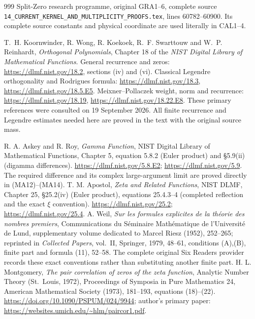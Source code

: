 \documentclass[11pt,a4paper]{article}
\begin{document}
\begin{thebibliography}{999}
Split-Zero research programme, original GRA1--6, complete source
\texttt{14\_CURRENT\_KERNEL\_AND\_MULTIPLICITY\_PROOFS.tex},
lines 60782--60900. Its complete source constants and physical
coordinate are used literally in CAL1--4.

T.~H. Koornwinder, R. Wong, R. Koekoek, R.~F. Swarttouw and
W.~P. Reinhardt, \emph{Orthogonal Polynomials}, Chapter 18 of the
\emph{NIST Digital Library of Mathematical Functions}.
General recurrence and zeros: \url{https://dlmf.nist.gov/18.2},
sections (iv) and (vi).
Classical Legendre orthogonality and Rodrigues formula:
\url{https://dlmf.nist.gov/18.3},
\url{https://dlmf.nist.gov/18.5.E5}.
Meixner--Pollaczek weight, norm and recurrence:
\url{https://dlmf.nist.gov/18.19},
\url{https://dlmf.nist.gov/18.22.E8}.
These primary references were consulted on 19 September 2026.
All finite recurrence and Legendre estimates needed here are
proved in the text with the original source mass.


 R. A. Askey and R. Roy, \emph{Gamma Function}, NIST Digital
Library of Mathematical Functions, Chapter 5, equation 5.8.2 (Euler product)
and \S5.9(ii) (digamma differences).
\url{https://dlmf.nist.gov/5.8.E2}; \url{https://dlmf.nist.gov/5.9}.
The required difference and its complex large-argument limit are proved
directly in (MA12)--(MA14).
 T. M. Apostol, \emph{Zeta and Related Functions}, NIST DLMF,
Chapter 25, \S25.2(iv) (Euler product), equations 25.4.3--4 (completed
reflection and the exact $\xi$ convention).
\url{https://dlmf.nist.gov/25.2}; \url{https://dlmf.nist.gov/25.4}.
 A. Weil, \emph{Sur les formules explicites de la th\'eorie
des nombres premiers}, Communications du S\'eminaire Math\'ematique de
l'Universit\'e de Lund, supplementary volume dedicated to Marcel Riesz
(1952), 252--265; reprinted in \emph{Collected Papers}, vol.~II,
Springer, 1979, 48--61, conditions (A),(B), finite part and formula (11),
52--58. The complete original Six Readers provider records these exact
conventions rather than substituting another finite part.
 H. L. Montgomery, \emph{The pair correlation of zeros
of the zeta function}, Analytic Number Theory (St.~Louis, 1972),
Proceedings of Symposia in Pure Mathematics 24, American Mathematical
Society (1973), 181--193, equations (18)--(22).
\url{https://doi.org/10.1090/PSPUM/024/9944}; author's primary paper:
\url{https://websites.umich.edu/~hlm/paircor1.pdf}.


\end{thebibliography}
\end{document}
